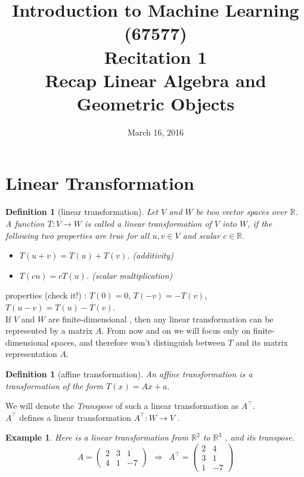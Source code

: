 \documentclass[11pt, oneside]{article}   	%
\title{{\large{Introduction to Machine Learning (67577)}}\\
\vphantom{}Recitation 1 \\
Recap Linear Algebra and Geometric Objects}
\date{March 16, 2016}
\newtheorem{definition}[lemma]{Definition}
\newtheorem{example}[lemma]{Example}
\begin{document}
\maketitle

\tableofcontents
\pagebreak




\section{Linear Transformation}

\begin{definition}[linear transformation]
Let $V$ and $W$ be two vector spaces over $\mathbb R$. A function $T:V\rightarrow W$ is called a linear transformation of $V$ into $W$, if the following two properties are true for all $u, v \in V$ and scalar $c\in \mathbb R$.
\begin{itemize}
\item $T(u+v) = T(u)+T(v)$. (additivity)
\item $T (cu) = cT (u)$. (scalar multiplication)
\end{itemize}
\end{definition}
properties (check it!) : $T(0)=0$, $T(-v)=-T(v)$, $T(u-v)=T(u)-T(v).$  \\

 If $V$  and $W$ are finite-dimensional , then any linear transformation can be represented by a matrix $A$. From now and on we will focus only on finite-dimensional spaces, and therefore won't distinguish between $T$ and its matrix representation $A$. \\

 
\begin{definition}[affine transformation]
An \textit{affine transformation} is a transformation of the form $T(x)=Ax+a.$
\end{definition}
 
  We will denote the \textit{Transpose} of such a linear transformation as $A^\top$.  \\
   $A^\top$ defines a linear transformation  $A^\top:W\to V$ .\\
  
  \begin{example}
  Here is a linear transformation from $\mathbb R^2$ to   $\mathbb R^3$ , and its transpose.
  \[A=\left( \begin{array}{ccc}
2 & 3 & 1\\
4 & 1  & -7 \end{array} \right) ~~\Rightarrow~~
  A^\top=\left( \begin{array}{ccc}
2 & 4  \\
3 & 1  \\
1 & -7\end{array} \right)\] 
 
 \end{example}
 
\end{document}
